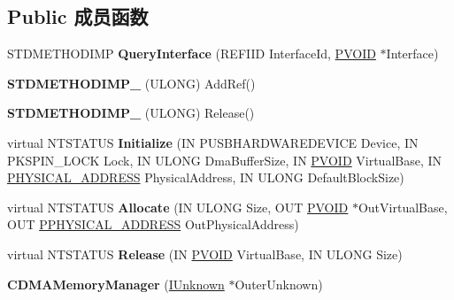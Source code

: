 \subsection*{Public 成员函数}
\begin{DoxyCompactItemize}
\item 
\mbox{\label{class_c_d_m_a_memory_manager_a532ec652e46271a15180b50abd73e7d7}} 
S\+T\+D\+M\+E\+T\+H\+O\+D\+I\+MP {\bfseries Query\+Interface} (R\+E\+F\+I\+ID Interface\+Id, \hyperlink{interfacevoid}{P\+V\+O\+ID} $\ast$Interface)
\item 
\mbox{\label{class_c_d_m_a_memory_manager_a76a380a44e4ddfe860dc870eb50c485c}} 
{\bfseries S\+T\+D\+M\+E\+T\+H\+O\+D\+I\+M\+P\+\_\+} (U\+L\+O\+NG) Add\+Ref()
\item 
\mbox{\label{class_c_d_m_a_memory_manager_a6cc7fd8808a907fb41c70b446b626684}} 
{\bfseries S\+T\+D\+M\+E\+T\+H\+O\+D\+I\+M\+P\+\_\+} (U\+L\+O\+NG) Release()
\item 
\mbox{\label{class_c_d_m_a_memory_manager_a9450ef0b969bf809da7c2ed554777e7b}} 
virtual N\+T\+S\+T\+A\+T\+US {\bfseries Initialize} (IN P\+U\+S\+B\+H\+A\+R\+D\+W\+A\+R\+E\+D\+E\+V\+I\+CE Device, IN P\+K\+S\+P\+I\+N\+\_\+\+L\+O\+CK Lock, IN U\+L\+O\+NG Dma\+Buffer\+Size, IN \hyperlink{interfacevoid}{P\+V\+O\+ID} Virtual\+Base, IN \hyperlink{union___l_a_r_g_e___i_n_t_e_g_e_r}{P\+H\+Y\+S\+I\+C\+A\+L\+\_\+\+A\+D\+D\+R\+E\+SS} Physical\+Address, IN U\+L\+O\+NG Default\+Block\+Size)
\item 
\mbox{\label{class_c_d_m_a_memory_manager_ab17891051da867fde7fffd7d619bc3c9}} 
virtual N\+T\+S\+T\+A\+T\+US {\bfseries Allocate} (IN U\+L\+O\+NG Size, O\+UT \hyperlink{interfacevoid}{P\+V\+O\+ID} $\ast$Out\+Virtual\+Base, O\+UT \hyperlink{union___l_a_r_g_e___i_n_t_e_g_e_r}{P\+P\+H\+Y\+S\+I\+C\+A\+L\+\_\+\+A\+D\+D\+R\+E\+SS} Out\+Physical\+Address)
\item 
\mbox{\label{class_c_d_m_a_memory_manager_a446fddf53b1bbf01994cc539f2542559}} 
virtual N\+T\+S\+T\+A\+T\+US {\bfseries Release} (IN \hyperlink{interfacevoid}{P\+V\+O\+ID} Virtual\+Base, IN U\+L\+O\+NG Size)
\item 
\mbox{\label{class_c_d_m_a_memory_manager_a2c18a24c0119afa83daa7b8e2c386ad1}} 
{\bfseries C\+D\+M\+A\+Memory\+Manager} (\hyperlink{interface_i_unknown}{I\+Unknown} $\ast$Outer\+Unknown)
\end{DoxyCompactItemize}
